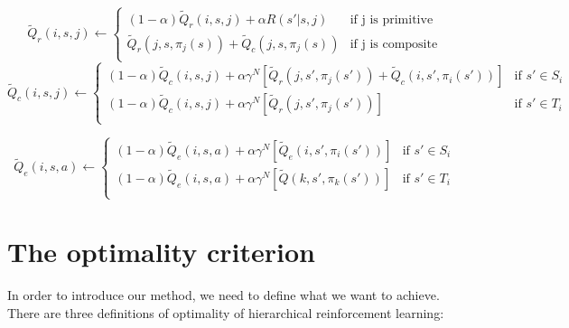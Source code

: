 \documentclass{article} %
\begin{document}
\begin{equation}
    \tilde{Q}_r(i, s, j) \leftarrow
    \left\{\begin{array}{ll}
    (1 - \alpha)\tilde{Q}_r(i, s, j) + \alpha R(s'| s, j)  & \mbox{if j is primitive} \\
    \tilde{Q}_r(j, s, \pi_j(s)) + \tilde{Q}_c(j, s, \pi_j(s)) & \mbox{if j is composite} \\
    \end{array} \right.
    \label{eq:TdQr}
\end{equation}
\begin{equation}
    \tilde{Q}_c(i, s, j) \leftarrow
    \left\{\begin{array}{ll}
    (1 - \alpha)\tilde{Q}_c(i, s, j) + \alpha \gamma^N[\tilde{Q}_r(j, s', \pi_j(s')) + \tilde{Q}_c(i, s', \pi_i(s'))]  & \mbox{if $s' \in S_i$} \\
    (1 - \alpha)\tilde{Q}_c(i, s, j) + \alpha \gamma^N[\tilde{Q}_r(j, s', \pi_j(s'))]  & \mbox{if $s' \in T_i$} \\
    \end{array} \right.
    \label{eq:TdQc}
\end{equation}

\begin{equation}
    \tilde{Q}_e(i, s, a) \leftarrow 
    \left\{\begin{array}{ll}
        (1 - \alpha)\tilde{Q}_e(i, s, a) + \alpha \gamma^N[\tilde{Q}_e(i, s', \pi_i(s'))] & \mbox{if $s' \in S_i$} \\
        (1 - \alpha)\tilde{Q}_e(i, s, a) + \alpha \gamma^N[\tilde{Q}(k, s', \pi_k(s'))] & \mbox{if $s' \in T_i$} \\
    \end{array} \right.
    \label{eq:TdQe}
\end{equation}
\section{The optimality criterion}
In order to introduce our method, we need to define what we want to achieve.
There are three definitions of optimality of hierarchical reinforcement learning:
\end{document}
